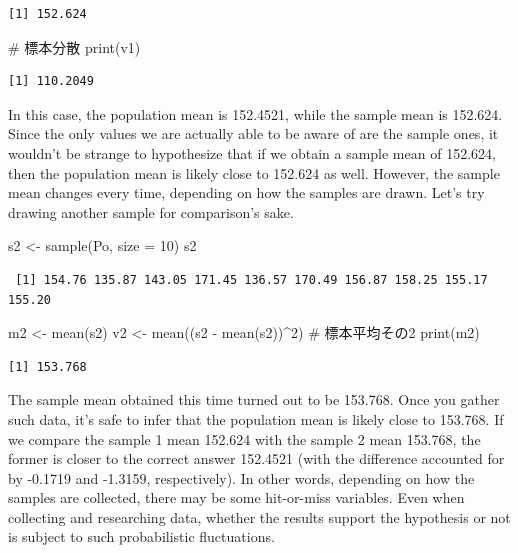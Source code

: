 \documentclass[
  a4paper,
]{book}
\newenvironment{Shaded}{\begin{snugshade}}{\end{snugshade}}
\newcommand{\AttributeTok}[1]{\textcolor[rgb]{0.40,0.45,0.13}{#1}}
\newcommand{\CommentTok}[1]{\textcolor[rgb]{0.37,0.37,0.37}{#1}}
\newcommand{\DecValTok}[1]{\textcolor[rgb]{0.68,0.00,0.00}{#1}}
\newcommand{\FunctionTok}[1]{\textcolor[rgb]{0.28,0.35,0.67}{#1}}
\newcommand{\NormalTok}[1]{\textcolor[rgb]{0.00,0.23,0.31}{#1}}
\newcommand{\OtherTok}[1]{\textcolor[rgb]{0.00,0.23,0.31}{#1}}
\newcommand{\SpecialCharTok}[1]{\textcolor[rgb]{0.37,0.37,0.37}{#1}}
\begin{document}
\begin{verbatim}
[1] 152.624
\end{verbatim}

\begin{Shaded}
\begin{Highlighting}[]
\CommentTok{\# 標本分散}
\FunctionTok{print}\NormalTok{(v1)}
\end{Highlighting}
\end{Shaded}

\begin{verbatim}
[1] 110.2049
\end{verbatim}

In this case, the population mean is 152.4521, while the sample mean is
152.624. Since the only values we are actually able to be aware of are
the sample ones, it wouldn't be strange to hypothesize that if we obtain
a sample mean of 152.624, then the population mean is likely close to
152.624 as well. However, the sample mean changes every time, depending
on how the samples are drawn. Let's try drawing another sample for
comparison's sake.

\begin{Shaded}
\begin{Highlighting}[]
\NormalTok{s2 }\OtherTok{\textless{}{-}} \FunctionTok{sample}\NormalTok{(Po, }\AttributeTok{size =} \DecValTok{10}\NormalTok{)}
\NormalTok{s2}
\end{Highlighting}
\end{Shaded}

\begin{verbatim}
 [1] 154.76 135.87 143.05 171.45 136.57 170.49 156.87 158.25 155.17 155.20
\end{verbatim}

\begin{Shaded}
\begin{Highlighting}[]
\NormalTok{m2 }\OtherTok{\textless{}{-}} \FunctionTok{mean}\NormalTok{(s2)}
\NormalTok{v2 }\OtherTok{\textless{}{-}} \FunctionTok{mean}\NormalTok{((s2 }\SpecialCharTok{{-}} \FunctionTok{mean}\NormalTok{(s2))}\SpecialCharTok{\^{}}\DecValTok{2}\NormalTok{)}
\CommentTok{\# 標本平均その2}
\FunctionTok{print}\NormalTok{(m2)}
\end{Highlighting}
\end{Shaded}

\begin{verbatim}
[1] 153.768
\end{verbatim}

The sample mean obtained this time turned out to be 153.768. Once you
gather such data, it's safe to infer that the population mean is likely
close to 153.768. If we compare the sample 1 mean 152.624 with the
sample 2 mean 153.768, the former is closer to the correct answer
152.4521 (with the difference accounted for by -0.1719 and -1.3159,
respectively). In other words, depending on how the samples are
collected, there may be some hit-or-miss variables. Even when collecting
and researching data, whether the results support the hypothesis or not
is subject to such probabilistic fluctuations.
\end{document}
